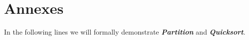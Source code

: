 \section{Annexes}

In the following lines we will formally demonstrate {\bfseries\itshape Partition} and {\bfseries\itshape Quicksort}.
